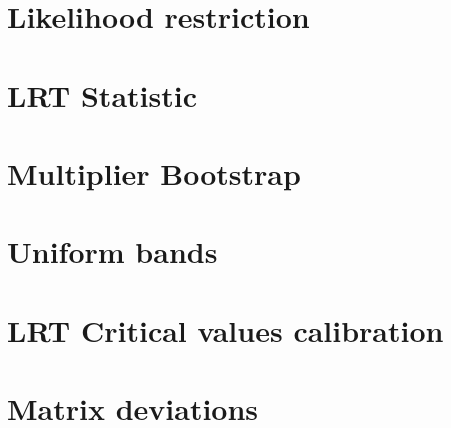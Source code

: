 











\usepackage{flowchart}
\usetikzlibrary{arrows}

\usepackage{natbib}



 
  
    

  
    
  	\section{Likelihood restriction}
    
   
 \section{LRT Statistic}
   
  
 \section{Multiplier Bootstrap}
   
  
  \section{Uniform bands}

  	

  
  \section{LRT Critical values calibration}
    
  
 \section{Matrix deviations}
  
  
